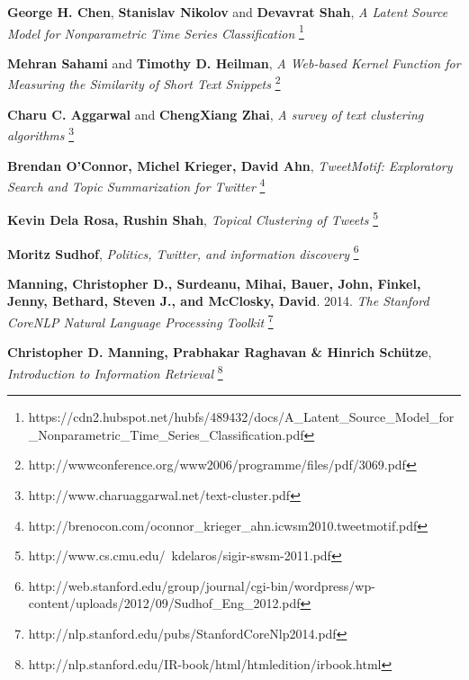 \begin{thebibliography}{9}

 \textbf{George H. Chen}, \textbf{Stanislav Nikolov} and \textbf{Devavrat Shah}, \textit{A Latent Source Model for Nonparametric Time Series Classification} \footnote{https://cdn2.hubspot.net/hubfs/489432/docs/A_Latent_Source_Model_for_Nonparametric_Time_Series_Classification.pdf}

 \textbf{Mehran Sahami} and \textbf{Timothy D. Heilman}, \textit{A Web-based Kernel Function for Measuring the Similarity of Short Text Snippets} \footnote{http://wwwconference.org/www2006/programme/files/pdf/3069.pdf}

 \textbf{Charu C. Aggarwal} and \textbf{ChengXiang Zhai},  \textit{A survey of text clustering algorithms} \footnote{http://www.charuaggarwal.net/text-cluster.pdf}

 \textbf{Brendan O’Connor, Michel Krieger, David Ahn}, \textit{TweetMotif: Exploratory Search and Topic Summarization for Twitter}  \footnote{http://brenocon.com/oconnor_krieger_ahn.icwsm2010.tweetmotif.pdf}

 \textbf{Kevin Dela Rosa, Rushin Shah}, \textit{Topical Clustering of Tweets} \footnote{http://www.cs.cmu.edu/~kdelaros/sigir-swsm-2011.pdf}

 \textbf{Moritz Sudhof}, \textit{Politics, Twitter, and information discovery} \footnote{http://web.stanford.edu/group/journal/cgi-bin/wordpress/wp-content/uploads/2012/09/Sudhof_Eng_2012.pdf}

 \textbf{Manning, Christopher D., Surdeanu, Mihai, Bauer, John, Finkel, Jenny, Bethard, Steven J., and McClosky, David}. 2014. \textit{The Stanford CoreNLP Natural Language Processing Toolkit} \footnote{http://nlp.stanford.edu/pubs/StanfordCoreNlp2014.pdf}

 \textbf{Christopher D. Manning, Prabhakar Raghavan \& Hinrich Schütze}, \textit{Introduction to Information Retrieval} \footnote{http://nlp.stanford.edu/IR-book/html/htmledition/irbook.html}

\end{thebibliography}

